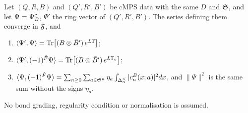 \begin{theorem}
\label{thm:cmps-overlap-parity}
Let $(Q,R,B)$ and $(Q',R',B')$ be cMPS data with the same $D$ and $\mathfrak S$, and let
$\Psi=\Psi^{\mathrm c}_{B}$, $\Psi'$ the ring vector of $(Q',R',B')$. The series defining them converge in
$\mathfrak F$, and
\begin{enumerate}
\item[(i)] $\langle\Psi',\Psi\rangle=\operatorname{Tr}\bigl[(B\otimes\bar B')\,e^{L\mathbb T}\bigr]$;
\item[(ii)] $\langle\Psi',(-1)^{\hat F}\Psi\rangle=\operatorname{Tr}\bigl[(B\otimes\bar B')\,e^{L\mathbb T_\eta}\bigr]$;
\item[(iii)] $\langle\Psi,(-1)^{\hat F}\Psi\rangle=\sum_{n\ge0}\sum_{a\in\mathfrak S^n}\eta_a\int_{\Delta^{<}_{n}}
|c^{B}_n(x;a)|^2dx$, and $\|\Psi\|^2$ is the same sum without the signs $\eta_a$.
\end{enumerate}
No bond grading, regularity condition or normalisation is assumed.
\end{theorem}

